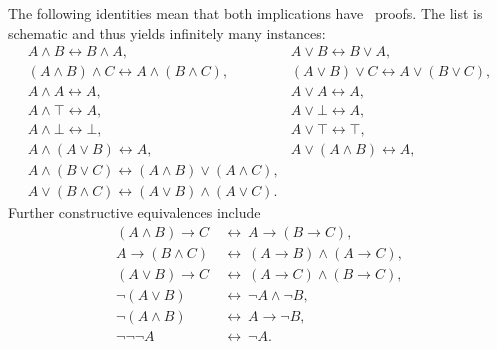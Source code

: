 The following identities mean that both implications have \IPC\ proofs.
The list is schematic and thus yields infinitely many instances:
\[
\begin{array}{ll}
 A\wedge B\leftrightarrow B\wedge A,&A\vee B\leftrightarrow B\vee A,\\
 (A\wedge B)\wedge C\leftrightarrow A\wedge(B\wedge C),&
 (A\vee B)\vee C\leftrightarrow A\vee(B\vee C),\\
 A\wedge A\leftrightarrow A,&A\vee A\leftrightarrow A,\\
 A\wedge\top\leftrightarrow A,&A\vee\bot\leftrightarrow A,\\
 A\wedge\bot\leftrightarrow\bot,&A\vee\top\leftrightarrow\top,\\
 A\wedge(A\vee B)\leftrightarrow A,&A\vee(A\wedge B)\leftrightarrow A,\\
 A\wedge(B\vee C)\leftrightarrow(A\wedge B)\vee(A\wedge C),&\phantom{X}\\
 A\vee(B\wedge C)\leftrightarrow(A\vee B)\wedge(A\vee C).&
\end{array}
\]
Further constructive equivalences include
\[
\begin{split}
 (A\wedge B)\to C&\ \leftrightarrow\ A\to(B\to C),\\
 A\to(B\wedge C)&\ \leftrightarrow\ (A\to B)\wedge(A\to C),\\
 (A\vee B)\to C&\ \leftrightarrow\ (A\to C)\wedge(B\to C),\\
 \neg(A\vee B)&\ \leftrightarrow\ \neg A\wedge\neg B,\\
 \neg(A\wedge B)&\ \leftrightarrow\ A\to\neg B,\\
 \neg\neg\neg A&\ \leftrightarrow\ \neg A.
\end{split}
\]

